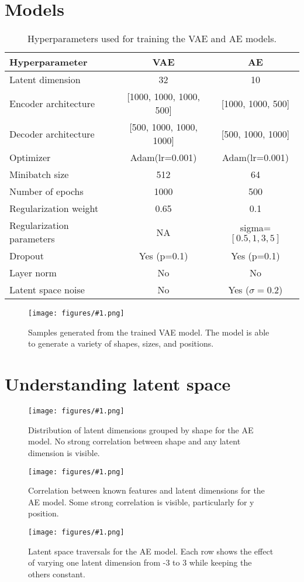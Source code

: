 \documentclass[conference,a4paper]{IEEEtran}
\newcommand{\centerfigure}[2]{
    \begin{figure}[htbp]
        \centering
        \texttt{[image: figures/\#1.png]}
        \caption{#2}
        \label{fig:#1}
    \end{figure}
}
\begin{document}



\appendix

\section{Models}

\begin{table}[htbp]
\caption{Hyperparameters used for training the VAE and AE models.}
\label{tab:hyperparams}
\centering
\begin{tabular}{l|c|c}
\toprule
\textbf{Hyperparameter} & \textbf{VAE} & \textbf{AE} \\
\midrule
Latent dimension & 32 & 10 \\
Encoder architecture & [1000, 1000, 1000, 500] & [1000, 1000, 500] \\
Decoder architecture & [500, 1000, 1000, 1000] & [500, 1000, 1000] \\
Optimizer & Adam(lr=0.001) & Adam(lr=0.001) \\
Minibatch size & 512 & 64 \\
Number of epochs & 1000 & 500 \\
Regularization weight & 0.65 & 0.1 \\
Regularization parameters & NA &  sigma=$[0.5,1,3,5]$\\
Dropout & Yes (p=0.1) & Yes (p=0.1) \\
Layer norm & No & No \\
Latent space noise & No & Yes ($\sigma=0.2$) \\
\bottomrule
\end{tabular}
\end{table}

\centerfigure{vae-generated}{Samples generated from the trained VAE model. The model is able to generate a variety of shapes, sizes, and positions.}

\section{Understanding latent space}

\centerfigure{ae-latent-by-shape}{Distribution of latent dimensions grouped by shape for the AE model. No strong correlation between shape and any latent dimension is visible.}

\centerfigure{ae-latent-corelation}{Correlation between known features and latent dimensions for the AE model. Some strong correlation is visible, particularly for y position.}

\centerfigure{ae-traversal-2}{Latent space traversals for the AE model. Each row shows the effect of varying one latent dimension from -3 to 3 while keeping the others constant.}
\end{document}
